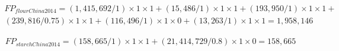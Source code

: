 \documentclass[]{article}
\begin{document}
\begin{equation}
\begin{multlined}
\label{eq:flourFP}
FP_{flourChina2014} = \left(1,415,692/1\right)\times 1\times 1 +\left(15,486/1\right)\times 1\times 1 
+\left(193,950/1\right)\times 1\times 1
+\\
\left(239,816/0.75\right)\times 1\times 1 +
\left(116,496/1\right)\times 1\times 0 +\left(13,263/1\right)\times 1\times 1= 1,958,146
\end{multlined}
\end{equation}

\begin{equation}
\begin{multlined}
\label{eq:starchFP}
FP_{starchChina2014} = \left(158,665/1\right)\times 1\times 1 +\left(21,414,729/0.8\right)\times 1\times 0 = 158,665
\end{multlined}
\end{equation}
\end{document}
